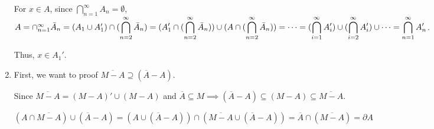 \documentclass[12pt]{article}
\begin{document}
\begin{enumerate}
    For $x \in A$, since $\displaystyle\bigcap_{n=1}^{\infty} A_n = \emptyset$, $A = \cap_{n=1}^{\infty} \bar{A}_n = (A_1\cup A_1') \cap (\displaystyle\bigcap_{n=2}^{\infty} \bar{A}_n)\\
    = (A_1' \cap (\displaystyle\bigcap_{n=2}^{\infty} \bar{A}_n)) \cup (A \cap (\displaystyle\bigcap_{n=2}^{\infty} \bar{A}_n)) = \cdots = (\displaystyle\bigcap_{i=1}^{\infty} A_i') \cup (\displaystyle\bigcap_{i=2}^{\infty} A_i') \cup \cdots = \displaystyle\bigcap_{n=1}^{\infty} A_n'$.
    
    Thus, $x \in A_1'$.
    \item First, we want to proof $\overline{M-A} \supseteq (\overline{A} - A)$.

    Since $\overline{M-A} = (M-A)' \cup (M-A)$ and $\overline{A} \subseteq M\implies (\overline{A} - A) \subseteq (M - A) \subseteq \overline{M-A}$.
    
    $(A \cap \overline{M-A}) \cup (\overline{A} - A) = (A\cup (\overline{A}-A)) \cap (\overline{M-A} \cup (\overline{A} - A)) = \overline{A} \cap (\overline{M-A}) = \partial A$ 
\end{enumerate}
\end{document}
